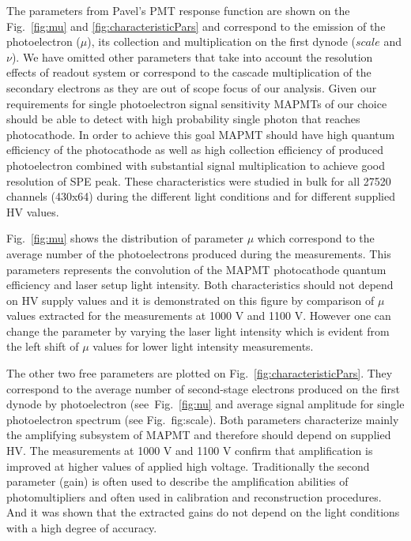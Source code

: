 The parameters from Pavel's PMT response function are shown on the Fig.~\ref{fig:mu} and \ref{fig:characteristicPars} and correspond to the emission of the photoelectron ($\mu$), its collection and multiplication on the first dynode ($scale$ and $\nu$).
We have omitted other parameters that take into account the resolution effects of readout system or correspond to the cascade multiplication of the secondary electrons as they are out of scope focus of our analysis.
Given our requirements for single photoelectron signal sensitivity MAPMTs of our choice should be able to detect with high probability single photon that reaches photocathode.
In order to achieve this goal MAPMT should have high quantum efficiency of the photocathode as well as high collection efficiency of produced photoelectron combined with substantial signal multiplication to achieve good resolution of SPE peak.
These characteristics were studied in bulk for all 27520 channels (430x64) during the different light conditions and for different supplied HV values.


Fig.~\ref{fig:mu} shows the distribution of parameter $\mu$ which correspond to the average number of the photoelectrons produced during the measurements.
This parameters represents the convolution of the MAPMT photocathode quantum efficiency and laser setup light intensity.
Both characteristics should not depend on HV supply values and it is demonstrated on this figure by comparison of $\mu$ values extracted for the measurements at 1000 V and 1100 V.
However one can change the parameter by varying the laser light intensity which is evident from the left shift of $\mu$ values for lower light intensity measurements.

The other two free parameters are plotted on Fig.~\ref{fig:characteristicPars}.
They correspond to the average number of second-stage electrons produced on the first dynode by photoelectron (see~Fig.~\ref{fig:nu} and average signal amplitude for single photoelectron spectrum (see Fig.~{fig:scale}).
Both parameters characterize mainly the amplifying subsystem of MAPMT and therefore should depend on supplied HV.
The measurements at 1000 V and 1100 V confirm that amplification is improved at higher values of applied high voltage.
Traditionally the second parameter (gain) is often used to describe the amplification abilities of photomultipliers and often used in calibration and reconstruction procedures.
And it was shown that the extracted gains do not depend on the light conditions with a high degree of accuracy.
\fi
